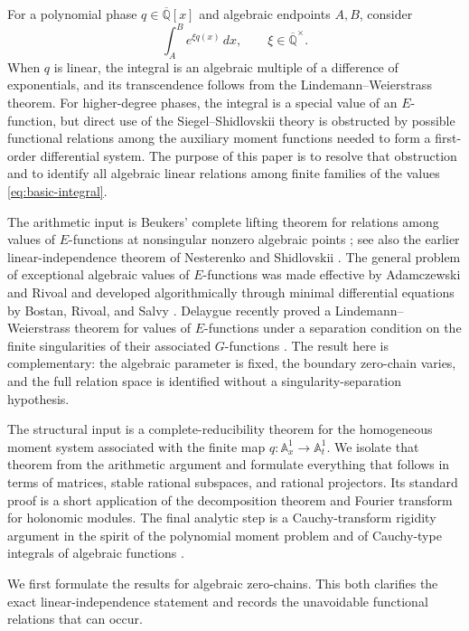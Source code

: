 \documentclass[11pt]{article}
\numberwithin{equation}{section}
\theoremstyle{definition}
\theoremstyle{remark}
\newcommand{\Qbar}{\overline{\mathbb Q}}
\newcommand{\Aone}{\mathbb A^1}
\begin{document}
For a polynomial phase $q\in\Qbar[x]$ and algebraic endpoints $A,B$, consider
\begin{equation}\label{eq:basic-integral}
  \int_A^B e^{\xi q(x)}\,dx,
  \qquad \xi\in\Qbar^\times.
\end{equation}
When $q$ is linear, the integral is an algebraic multiple of a difference of
exponentials, and its transcendence follows from the
Lindemann--Weierstrass theorem.  For higher-degree phases, the integral is a
special value of an $E$-function, but direct use of the
Siegel--Shidlovskii theory is obstructed by possible functional relations among
the auxiliary moment functions needed to form a first-order differential
system.  The purpose of this paper is to resolve that obstruction and to
identify all algebraic linear relations among finite families of the values
\eqref{eq:basic-integral}.

The arithmetic input is Beukers' complete lifting theorem for relations among
values of $E$-functions at nonsingular nonzero algebraic points
\cite{Beukers}; see also the earlier linear-independence theorem of
Nesterenko and Shidlovskii \cite{NesterenkoShidlovskii}.  The general problem
of exceptional algebraic values of $E$-functions was made effective by
Adamczewski and Rivoal \cite{AdamczewskiRivoal} and developed algorithmically
through minimal differential equations by Bostan, Rivoal, and Salvy
\cite{BostanRivoalSalvy}.  Delaygue recently proved a
Lindemann--Weierstrass theorem for values of $E$-functions under a separation
condition on the finite singularities of their associated $G$-functions
\cite{Delaygue}.  The result here is complementary: the algebraic parameter
is fixed, the boundary zero-chain varies, and the full relation space is
identified without a singularity-separation hypothesis.

The structural input is a complete-reducibility theorem for the homogeneous
moment system associated with the finite map $q:\Aone_x\to\Aone_t$.  We
isolate that theorem from the arithmetic argument and formulate everything
that follows in terms of matrices, stable rational subspaces, and rational
projectors.  Its standard proof is a short application of the decomposition
theorem and Fourier transform for holonomic modules.  The final analytic step
is a Cauchy-transform rigidity argument in the spirit of the polynomial
moment problem and of Cauchy-type integrals of algebraic functions
\cite{PakovichMuzychuk,PakovichRoytvarfYomdin}.

We first formulate the results for algebraic zero-chains.  This both clarifies
the exact linear-independence statement and records the unavoidable functional
relations that can occur.
\end{document}
